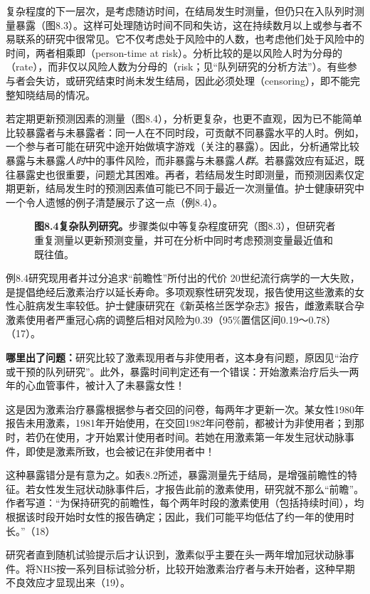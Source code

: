 复杂程度的下一层次，是考虑随访时间，在结局发生时测量，但仍只在入队列时测量暴露（图8.3）。这样可处理随访时间不同和失访，这在持续数月以上或参与者不易联系的研究中很常见。它不仅考虑处于风险中的人数，也考虑他们处于风险中的时间，两者相乘即（person-time at risk）。分析比较的是以风险人时为分母的（rate），而非仅以风险人数为分母的（risk；见“队列研究的分析方法”）。有些参与者会失访，或研究结束时尚未发生结局，因此必须处理（censoring），即不能完整知晓结局的情况。

若定期更新预测因素的测量（图8.4），分析更复杂，也更不直观，因为已不能简单比较暴露者与未暴露者：同一人在不同时段，可贡献不同暴露水平的人时。例如，一个参与者可能在研究中途开始做填字游戏（关注的暴露）。因此，分析通常比较暴露与未暴露\emph{人时}中的事件风险，而非暴露与未暴露\emph{人群}。若暴露效应有延迟，既往暴露史也很重要，问题尤其困难。再者，若结局发生时即测量，而预测因素仅定期更新，结局发生时的预测因素值可能已不同于最近一次测量值。护士健康研究中一个令人遗憾的例子清楚展示了这一点（例8.4）。
\begin{figure}[htbp]\centering{}
\caption*{\textbf{图8.4\quad 复杂队列研究。}步骤类似中等复杂程度研究（图8.3），但研究者重复测量以更新预测变量，并可在分析中同时考虑预测变量最近值和既往值。}
\end{figure}

\begin{bookbox}{例8.4\quad 研究现用者并过分追求“前瞻性”所付出的代价}
20世纪流行病学的一大失败，是提倡绝经后激素治疗以延长寿命。多项观察性研究发现，报告使用这些激素的女性心脏病发生率较低。护士健康研究在《新英格兰医学杂志》报告，雌激素联合孕激素使用者严重冠心病的调整后相对风险为0.39（95\%置信区间0.19～0.78）（17）。

\textbf{哪里出了问题：}研究比较了激素现用者与非使用者，这本身有问题，原因见“治疗或干预的队列研究”。此外，暴露时间判定还有一个错误：开始激素治疗后头一两年的心血管事件，被计入了未暴露女性！

这是因为激素治疗暴露根据参与者交回的问卷，每两年才更新一次。某女性1980年报告未用激素，1981年开始使用，在交回1982年问卷前，都被计为非使用者；到那时，若仍在使用，才开始累计使用者时间。若她在用激素第一年发生冠状动脉事件，即使是激素所致，也会被记在非使用者中！

这种暴露错分是有意为之。如表8.2所述，暴露测量先于结局，是增强前瞻性的特征。若女性发生冠状动脉事件后，才报告此前的激素使用，研究就不那么“前瞻”。作者写道：“为保持研究的前瞻性，每个两年时段的激素使用（包括持续时间），均根据该时段开始时女性的报告确定；因此，我们可能平均低估了约一年的使用时长。”（18）

研究者直到随机试验提示后才认识到，激素似乎主要在头一两年增加冠状动脉事件。将NHS按一系列目标试验分析，比较开始激素治疗者与未开始者，这种早期不良效应才显现出来（19）。
\end{bookbox}

